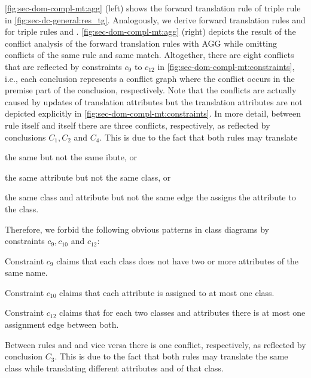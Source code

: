 \begin{example}
\cref{fig:sec-dom-compl-mt:agg} (left) shows the forward translation rule  of triple rule  in \cref{fig:sec-dc-general:res_tg}.
Analogously, we derive forward translation rules  and  for triple rules  and .
\cref{fig:sec-dom-compl-mt:agg} (right) depicts the result of the conflict analysis of the forward translation rules with AGG \cite{AGG} while omitting conflicts of the same rule and same match.
Altogether, there are eight conflicts that are reflected by constraints $c_9$ to $c_{12}$ in \cref{fig:sec-dom-compl-mt:constraints}, i.e., each conclusion represents a conflict graph where the conflict occurs in the premise part of the conclusion, respectively.
Note that the conflicts are actually caused by updates of translation attributes but the translation attributes are not depicted explicitly in \cref{fig:sec-dom-compl-mt:constraints}.
In more detail, between rule  itself and  itself there are three conflicts, respectively, as reflected by conclusions $C_1,C_2$ and $C_4$.
This is due to the fact that both rules may translate
\begin{enumerate*}
\item the same  but not the same ibute, or
\item the same attribute but not the same class, or
\item the same class and attribute but not the same edge  the assigns the attribute to the class.
\end{enumerate*}
Therefore, we forbid the following obvious patterns in class diagrams by constraints $c_9,c_{10}$ and $c_{12}$:
\begin{enumerate*}
  \item Constraint $c_9$ claims that each class does not have two or more attributes of the same name.
  \item Constraint $c_{10}$ claims that each attribute is assigned to at most one class.
  \item Constraint $c_{12}$ claims that for each two classes and attributes there is at most one assignment edge  between both.
\end{enumerate*}
Between rules  and  and vice versa there is one conflict, respectively, as reflected by conclusion $C_3$.
This is due to the fact that both rules may translate the same class while translating different attributes  and  of that class.

\end{example}
